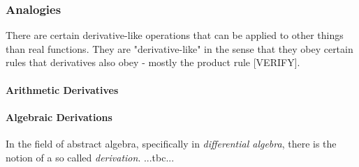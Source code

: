 
\subsubsection{Analogies}
There are certain derivative-like operations that can be applied to other things than real functions. They are "derivative-like" in the sense that they obey certain rules that derivatives also obey - mostly the product rule [VERIFY].

\paragraph{Arithmetic Derivatives}

\paragraph{Algebraic Derivations}
In the field of abstract algebra, specifically in \emph{differential algebra}, there is the notion of a so called \emph{derivation}. ...tbc...


%

